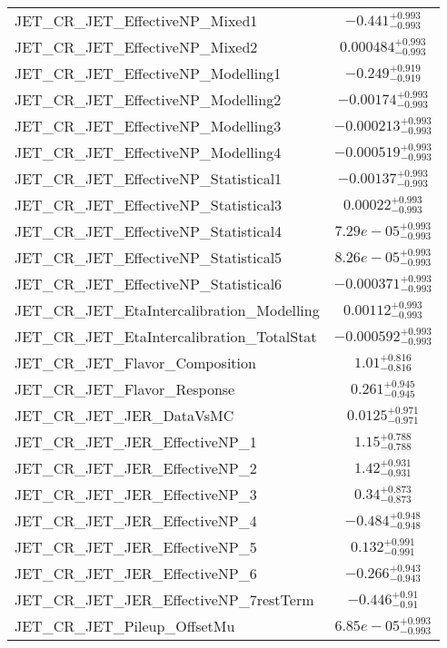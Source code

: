 \begin{tabular}{|l|c|}
JET\_CR\_JET\_EffectiveNP\_Mixed1 & $-0.441^{+0.993}_{-0.993}$ \\
JET\_CR\_JET\_EffectiveNP\_Mixed2 & $0.000484^{+0.993}_{-0.993}$ \\
JET\_CR\_JET\_EffectiveNP\_Modelling1 & $-0.249^{+0.919}_{-0.919}$ \\
JET\_CR\_JET\_EffectiveNP\_Modelling2 & $-0.00174^{+0.993}_{-0.993}$ \\
JET\_CR\_JET\_EffectiveNP\_Modelling3 & $-0.000213^{+0.993}_{-0.993}$ \\
JET\_CR\_JET\_EffectiveNP\_Modelling4 & $-0.000519^{+0.993}_{-0.993}$ \\
JET\_CR\_JET\_EffectiveNP\_Statistical1 & $-0.00137^{+0.993}_{-0.993}$ \\
JET\_CR\_JET\_EffectiveNP\_Statistical3 & $0.00022^{+0.993}_{-0.993}$ \\
JET\_CR\_JET\_EffectiveNP\_Statistical4 & $7.29e-05^{+0.993}_{-0.993}$ \\
JET\_CR\_JET\_EffectiveNP\_Statistical5 & $8.26e-05^{+0.993}_{-0.993}$ \\
JET\_CR\_JET\_EffectiveNP\_Statistical6 & $-0.000371^{+0.993}_{-0.993}$ \\
JET\_CR\_JET\_EtaIntercalibration\_Modelling & $0.00112^{+0.993}_{-0.993}$ \\
JET\_CR\_JET\_EtaIntercalibration\_TotalStat & $-0.000592^{+0.993}_{-0.993}$ \\
JET\_CR\_JET\_Flavor\_Composition & $1.01^{+0.816}_{-0.816}$ \\
JET\_CR\_JET\_Flavor\_Response & $0.261^{+0.945}_{-0.945}$ \\
JET\_CR\_JET\_JER\_DataVsMC & $0.0125^{+0.971}_{-0.971}$ \\
JET\_CR\_JET\_JER\_EffectiveNP\_1 & $1.15^{+0.788}_{-0.788}$ \\
JET\_CR\_JET\_JER\_EffectiveNP\_2 & $1.42^{+0.931}_{-0.931}$ \\
JET\_CR\_JET\_JER\_EffectiveNP\_3 & $0.34^{+0.873}_{-0.873}$ \\
JET\_CR\_JET\_JER\_EffectiveNP\_4 & $-0.484^{+0.948}_{-0.948}$ \\
JET\_CR\_JET\_JER\_EffectiveNP\_5 & $0.132^{+0.991}_{-0.991}$ \\
JET\_CR\_JET\_JER\_EffectiveNP\_6 & $-0.266^{+0.943}_{-0.943}$ \\
JET\_CR\_JET\_JER\_EffectiveNP\_7restTerm & $-0.446^{+0.91}_{-0.91}$ \\
JET\_CR\_JET\_Pileup\_OffsetMu & $6.85e-05^{+0.993}_{-0.993}$ \\

\end{tabular}
